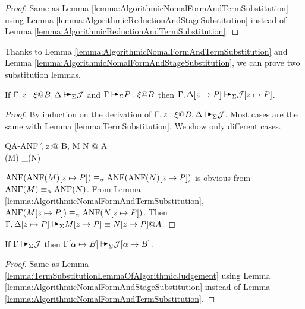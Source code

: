 \begin{proof}
    Same as Lemma \ref{lemma:AlgorithmicNomalFormAndTermSubstitution} using
    Lemma \ref{lemma:AlgorithmicReductionAndStageSubstitution} instead of Lemma
    \ref{lemma:AlgorithmicReductionAndTermSubstitution}.
\end{proof}

Thanks to Lemma \ref{lemma:AlgorithmicNomalFormAndTermSubstitution} and Lemma
\ref{lemma:AlgorithmicNomalFormAndStageSubstitution}, we can prove two
substitution lemmas.

\begin{lemma}
    \label{lemma:TermSubstitutionLemmaOfAlgorithmicJudgement}
    If $\G, z:\xi@B, \D \AVS \mathcal{J}$ and $\G\AVS P:\xi @B$ then $\G, \D[z \mapsto P] \AVS \mathcal{J}[z \mapsto P]$.
\end{lemma}

\begin{proof}
    By induction on the derivation of \( \G, z:\xi@B, \D \AVS \mathcal{J}
    \). Most cases are the same with Lemma \ref{lemma:TermSubstitution}. We show
    only different cases.

    \begin{rneqncase}{\textsc{QA-ANF}}{
            \G, z:\xi @ B, \D \AVS M \E N @ A \\
            \ANF(M) \E_\alpha \ANF(N)
        }
    \end{rneqncase}
    \( \text{ANF}(\text{ANF}(M)[z \mapsto P]) \equiv_\alpha \text{ANF}(\text{ANF}(N)[z \mapsto P]) \) is obvious from \( \text{ANF}(M) \equiv_\alpha \text{ANF}(N) \).
    From Lemma \ref{lemma:AlgorithmicNomalFormAndTermSubstitution}, \( \text{ANF}(M[z \mapsto P]) \equiv_\alpha \text{ANF}(N[z \mapsto P]) \).
    Then \( \G, \D[z \mapsto P] \AVS M[z \mapsto P] \E N[z \mapsto P] @ A \).
\end{proof}

\begin{lemma}
    \label{lemma:StageSubstitutionLemmaofAlgorithmicJudgement}
    If $\G \AVS \mathcal{J}$ then $\G[\alpha \mapsto B] \AVS \mathcal{J}[\alpha \mapsto B]$.
\end{lemma}

\begin{proof}
    Same as Lemma \ref{lemma:TermSubstitutionLemmaOfAlgorithmicJudgement} using
    Lemma \ref{lemma:AlgorithmicNomalFormAndStageSubstitution} instead of Lemma
    \ref{lemma:AlgorithmicNomalFormAndTermSubstitution}.
\end{proof}

